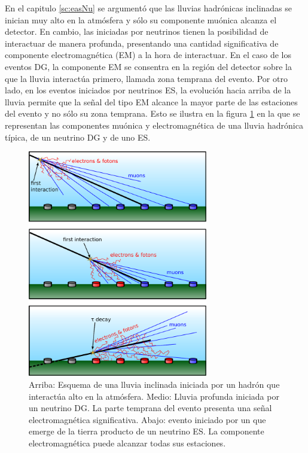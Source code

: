 	En el capitulo \ref{sc:easNu} se argumentó que las lluvias hadrónicas inclinadas se inician muy alto en la atmósfera y sólo su componente muónica alcanza el detector.
	En cambio, las iniciadas por neutrinos tienen la posibilidad de interactuar de manera profunda, presentando una cantidad significativa de componente electromagnética (EM) a la hora de interactuar.
	En el caso de los eventos DG, la componente EM se consentra en la región del detector sobre la que la lluvia interactúa primero, llamada zona temprana del evento.
	Por otro lado, en los eventos iniciados por neutrinos ES, la evolución hacia arriba de la lluvia permite que la señal del tipo EM alcance la mayor parte de las estaciones del evento y no sólo su zona temprana.
	Esto se ilustra en la figura \ref{fig:compNus} en la que se representan las componentes muónica y electromagnética de una lluvia hadrónica típica, de un neutrino DG y de uno ES.
	\begin{figure}[ht!]
		\begin{center}
		\includegraphics[width=0.7\textwidth]{fig/seleccionAuger/inclined_regular_dg_and_up}
		\caption{Arriba: Esquema de una lluvia inclinada iniciada por un hadrón que interactúa alto en la atmósfera. Medio: Lluvia profunda iniciada por un neutrino DG. La parte temprana del evento presenta una señal electromagnética significativa. Abajo: evento iniciado por un \tauon{} que emerge de la tierra producto de un neutrino ES. La componente electromagnética puede alcanzar todas sus estaciones.}
		\label{fig:compNus}
		\end{center}
	\end{figure}
	
